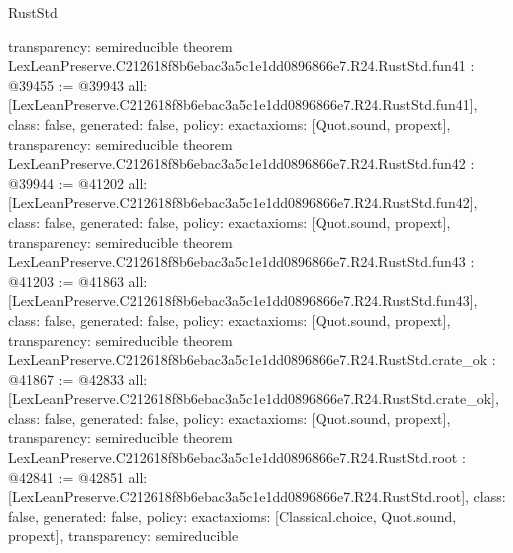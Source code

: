\begin{lexlean}{RustStd}
\begin{coremodule}
{  transparency: semireducible
}
theorem LexLeanPreserve.C212618f8b6ebac3a5c1e1dd0896866e7.R24.RustStd.fun41 : @39455 := @39943 {
  all: [LexLeanPreserve.C212618f8b6ebac3a5c1e1dd0896866e7.R24.RustStd.fun41],
  class: false,
  generated: false,
  policy: exact{axioms: [Quot.sound, propext]},
  transparency: semireducible
}
theorem LexLeanPreserve.C212618f8b6ebac3a5c1e1dd0896866e7.R24.RustStd.fun42 : @39944 := @41202 {
  all: [LexLeanPreserve.C212618f8b6ebac3a5c1e1dd0896866e7.R24.RustStd.fun42],
  class: false,
  generated: false,
  policy: exact{axioms: [Quot.sound, propext]},
  transparency: semireducible
}
theorem LexLeanPreserve.C212618f8b6ebac3a5c1e1dd0896866e7.R24.RustStd.fun43 : @41203 := @41863 {
  all: [LexLeanPreserve.C212618f8b6ebac3a5c1e1dd0896866e7.R24.RustStd.fun43],
  class: false,
  generated: false,
  policy: exact{axioms: [Quot.sound, propext]},
  transparency: semireducible
}
theorem LexLeanPreserve.C212618f8b6ebac3a5c1e1dd0896866e7.R24.RustStd.crate_ok : @41867 := @42833 {
  all: [LexLeanPreserve.C212618f8b6ebac3a5c1e1dd0896866e7.R24.RustStd.crate_ok],
  class: false,
  generated: false,
  policy: exact{axioms: [Quot.sound, propext]},
  transparency: semireducible
}
theorem LexLeanPreserve.C212618f8b6ebac3a5c1e1dd0896866e7.R24.RustStd.root : @42841 := @42851 {
  all: [LexLeanPreserve.C212618f8b6ebac3a5c1e1dd0896866e7.R24.RustStd.root],
  class: false,
  generated: false,
  policy: exact{axioms: [Classical.choice, Quot.sound, propext]},
  transparency: semireducible
}


\end{coremodule}
\end{lexlean}
